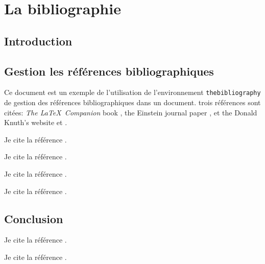 \chapter{La bibliographie}


\section{Introduction}


\section{Gestion les références bibliographiques}
 
Ce document est un exemple de l'utilisation de l'environnement \texttt{thebibliography} de gestion des références bibliographiques dans un document. trois références sont citées: \textit{The \LaTeX\ Companion} 
book \cite{Johnson}, the Einstein journal paper \cite{Zoran}, et the 
Donald Knuth's website \cite{late} et \cite{texb}. 

Je cite la référence \cite{Laverdure1983}. 

Je cite la référence \cite{Agusti2003}. 

Je cite la référence \cite{Yamada2005}. 


Je cite la référence \cite{ref3}. 



\section{Conclusion}


Je cite la référence \cite{ref4}. 



Je cite la référence \cite{WinNT}. 





